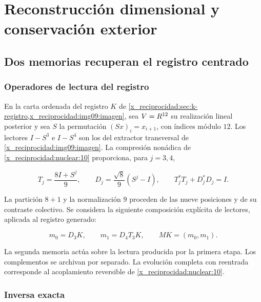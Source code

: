 \chapter{Reconstrucción dimensional y conservación exterior}
\label{x_reciprocidad:nuclear:11}
\section{Dos memorias recuperan el registro centrado}

\subsection{Operadores de lectura del registro}

En la carta ordenada del registro \(K\) de
\cref{x_reciprocidad:sec:k-registro,x_reciprocidad:img09:imagen}, sea \(V=R^{12}\) su
realización lineal posterior y sea \(S\) la permutación
\((Sx)_i=x_{i+1}\), con índices módulo \(12\).
Los lectores \(I-S^3\) e \(I-S^4\) son los del extractor transversal
de \cref{x_reciprocidad:img09:imagen}.
La compresión nonádica de \cref{x_reciprocidad:nuclear:10} proporciona,
para \(j=3,4\),



\begin{equation}
T_j=\frac{8I+S^j}{9},\qquad D_j=\frac{\sqrt8}{9}(S^j-I),
\qquad T_j^*T_j+D_j^*D_j=I.
\label{x_reciprocidad:nuc11:eq:1}
\end{equation}



La partición \(8+1\) y la normalización \(9\) proceden de las nueve
posiciones y de su contraste colectivo.
Se considera la siguiente composición explícita de lectores,
aplicada al registro generado:



\begin{equation}
m_0=D_3K,\qquad m_1=D_4T_3K,
\qquad M K=(m_0,m_1).
\label{x_reciprocidad:nuc11:eq:2}
\end{equation}



La segunda memoria actúa sobre la lectura producida por la primera
etapa. Los complementos se archivan por separado.
La evolución completa con reentrada corresponde al acoplamiento
reversible de \cref{x_reciprocidad:nuclear:10}.

\subsection{Inversa exacta}

